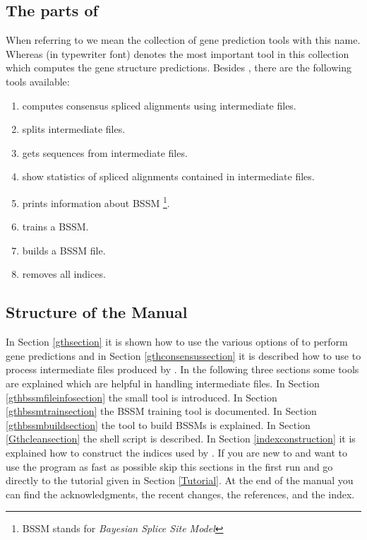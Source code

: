 \documentclass[11pt,a4paper,titlepage]{article}
\begin{document}
\subsection{The parts of \Gth}
When referring to \Gth we mean the collection of gene prediction tools with
this name. Whereas \Callgth (in typewriter font) denotes the most important
tool in this collection which computes the gene structure predictions. Besides
\Callgth, there are the following tools available:
\begin{enumerate}
\item \Callgthconsensus computes consensus spliced alignments using intermediate files.
\item \Callgthsplit splits intermediate files.
\item \Callgthgetseq gets \Fasta sequences from intermediate files.
\item \Callgthfilestat show statistics of spliced alignments contained in intermediate files.
\item \Callgthbssmfileinfo prints information about BSSM \footnote{BSSM stands
for \emph{Bayesian Splice Site Model}}.
\item \Callgthbssmtrain trains a BSSM.
\item \Callgthbssmbuild builds a BSSM file.
\item \Callgthclean removes all indices.
\end{enumerate}

\subsection{Structure of the Manual}
In Section \ref{gthsection} it is shown how to use the various options of
\Callgth to perform gene predictions and in Section \ref{gthconsensussection}
it is described how to use \Callgthconsensus to process intermediate files
produced by \Callgth.
In the following three sections some tools are explained which are helpful in handling intermediate files.
In Section \ref{gthbssmfileinfosection} the small tool \Callgthbssmfileinfo is
introduced. In Section \ref{gthbssmtrainsection} the BSSM training tool \Callgthbssmtrain is documented. In Section \ref{gthbssmbuildsection} the tool \Callgthbssmbuild to build BSSMs is explained. In Section \ref{Gthcleansection} the shell script \Callgthclean is described.
In Section \ref{indexconstruction} it is explained how
to construct the indices used by \Gth.
If you are new to \Gth and want to use the program as fast as possible skip
this sections in the first run and go directly to the tutorial given in Section
\ref{Tutorial}. At the end of the manual you can find the acknowledgments, the recent changes, the references, and the index.
\end{document}
